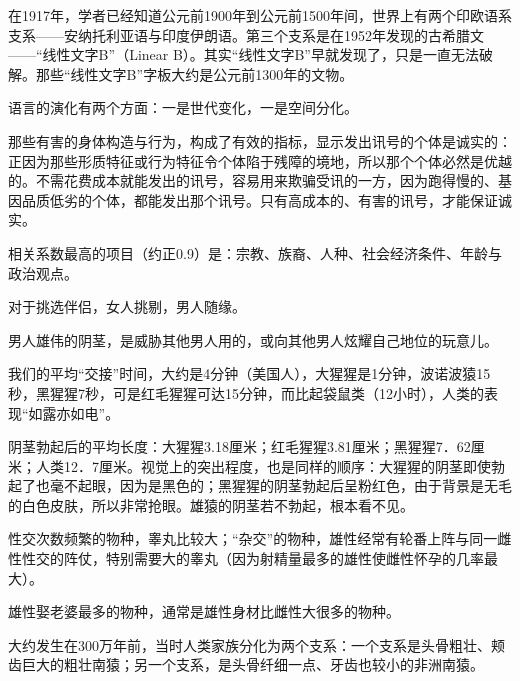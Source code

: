 在1917年，学者已经知道公元前1900年到公元前1500年间，世界上有两个印欧语系支系——安纳托利亚语与印度伊朗语。第三个支系是在1952年发现的古希腊文——“线性文字B”（Linear B）。其实“线性文字B”早就发现了，只是一直无法破解。那些“线性文字B”字板大约是公元前1300年的文物。

语言的演化有两个方面：一是世代变化，一是空间分化。

那些有害的身体构造与行为，构成了有效的指标，显示发出讯号的个体是诚实的：正因为那些形质特征或行为特征令个体陷于残障的境地，所以那个个体必然是优越的。不需花费成本就能发出的讯号，容易用来欺骗受讯的一方，因为跑得慢的、基因品质低劣的个体，都能发出那个讯号。只有高成本的、有害的讯号，才能保证诚实。

相关系数最高的项目（约正0.9）是：宗教、族裔、人种、社会经济条件、年龄与政治观点。

对于挑选伴侣，女人挑剔，男人随缘。

男人雄伟的阴茎，是威胁其他男人用的，或向其他男人炫耀自己地位的玩意儿。

我们的平均“交接”时间，大约是4分钟（美国人），大猩猩是1分钟，波诺波猿15秒，黑猩猩7秒，可是红毛猩猩可达15分钟，而比起袋鼠类（12小时），人类的表现“如露亦如电”。

阴茎勃起后的平均长度：大猩猩3.18厘米；红毛猩猩3.81厘米；黑猩猩7．62厘米；人类12．7厘米。视觉上的突出程度，也是同样的顺序：大猩猩的阴茎即使勃起了也毫不起眼，因为是黑色的；黑猩猩的阴茎勃起后呈粉红色，由于背景是无毛的白色皮肤，所以非常抢眼。雄猿的阴茎若不勃起，根本看不见。

性交次数频繁的物种，睾丸比较大；“杂交”的物种，雄性经常有轮番上阵与同一雌性性交的阵仗，特别需要大的睾丸（因为射精量最多的雄性使雌性怀孕的几率最大）。

雄性娶老婆最多的物种，通常是雄性身材比雌性大很多的物种。

大约发生在300万年前，当时人类家族分化为两个支系：一个支系是头骨粗壮、颊齿巨大的粗壮南猿；另一个支系，是头骨纤细一点、牙齿也较小的非洲南猿。